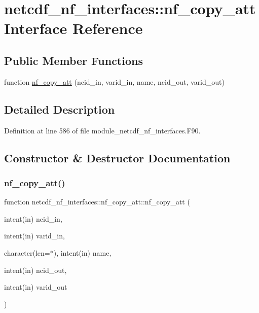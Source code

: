 \hypertarget{interfacenetcdf__nf__interfaces_1_1nf__copy__att}{}\section{netcdf\+\_\+nf\+\_\+interfaces\+:\+:nf\+\_\+copy\+\_\+att Interface Reference}
\label{interfacenetcdf__nf__interfaces_1_1nf__copy__att}
\subsection*{Public Member Functions}
\begin{DoxyCompactItemize}
\item 
function \hyperlink{interfacenetcdf__nf__interfaces_1_1nf__copy__att_af792e8e65b6d2e31c284770b541592bb}{nf\+\_\+copy\+\_\+att} (ncid\+\_\+in, varid\+\_\+in, name, ncid\+\_\+out, varid\+\_\+out)
\end{DoxyCompactItemize}


\subsection{Detailed Description}


Definition at line 586 of file module\+\_\+netcdf\+\_\+nf\+\_\+interfaces.\+F90.



\subsection{Constructor \& Destructor Documentation}
\mbox{\label{interfacenetcdf__nf__interfaces_1_1nf__copy__att_af792e8e65b6d2e31c284770b541592bb}} 
\subsubsection{\texorpdfstring{nf\+\_\+copy\+\_\+att()}{nf\_copy\_att()}}
{\footnotesize\ttfamily function netcdf\+\_\+nf\+\_\+interfaces\+::nf\+\_\+copy\+\_\+att\+::nf\+\_\+copy\+\_\+att (\begin{DoxyParamCaption}\item[{intent(in)}]{ncid\+\_\+in,  }\item[{intent(in)}]{varid\+\_\+in,  }\item[{character(len=$\ast$), intent(in)}]{name,  }\item[{intent(in)}]{ncid\+\_\+out,  }\item[{intent(in)}]{varid\+\_\+out }\end{DoxyParamCaption})}



